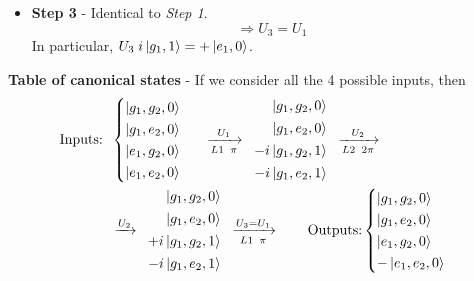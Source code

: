 \begin{itemize}
    \begin{center}
    
    \end{center}


\item \textbf{Step 3} - Identical to \textit{Step 1}.
    $$\Rightarrow U_3 = U_1$$
    In particular, $U_3\;i\ket{g_1, 1} = + \ket{e_1,0}$.
\end{itemize}


\noindent \textbf{Table of canonical states} - If we consider all the 4 possible inputs, then
\begin{align*}
    \text{Inputs:}\;\;&
    \begin{cases}
        \ket{ g_1, g_2, 0} \\[1pt]
        \ket{ g_1, e_2, 0} \\[1pt]
        \ket{ e_1, g_2, 0} \\[1pt]
        \ket{ e_1, e_2, 0}
    \end{cases}
    \;\; \xrightarrow[L1\;\;\pi]{U_1} \;\;
    \begin{aligned}
        \ket{ g_1, g_2, 0} \\[1pt]
        \ket{ g_1, e_2, 0} \\[1pt]
        - i\ket{ g_1, g_2, 1} \\[1pt]
        - i\ket{ g_1, e_2, 1}
    \end{aligned}
    \;\; \xrightarrow[L2\;\;2\pi]{U_2} \\
    & \xrightarrow{U_2} \;\;
    \begin{aligned}
        \ket{ g_1, g_2, 0} \\[1pt]
        \ket{ g_1, e_2, 0} \\[1pt]
        + i\ket{ g_1, g_2, 1} \\[1pt]
        - i\ket{ g_1, e_2, 1}
    \end{aligned}
    \;\; \xrightarrow[L1\;\;\pi]{U_3=U_1} \qquad
    \text{Outputs:}
    \begin{cases}
        \ket{ g_1, g_2, 0} \\[1pt]
        \ket{ g_1, e_2, 0} \\[1pt]
        \ket{ e_1, g_2, 0} \\[1pt]
        - \ket{ e_1, e_2, 0}
    \end{cases}
\end{align*}

